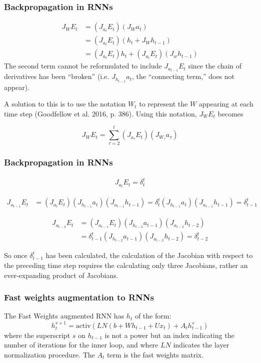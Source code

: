 \documentclass{beamer}
\begin{document}
\begin{frame}
  \frametitle{Backpropagation in RNNs}
  \begin{align*}
  J_{W} E_t & = (J_{a_t} E_t)(J_W a_t) \\
  & = (J_{a_t} E_t)(h_t + J_W h_{t-1}) \\
  & = (J_{a_t} E_t)h_t + (J_{a_t} E_t)(J_w h_{t-1})
\end{align*}
%
  The second term cannot be reformulated to include $J_{a_{t-1}} E_t$ since the chain of derivatives has been ``broken'' (i.e. $J_{h_{t-1}} a_t$, the ``connecting term,'' does not appear).

  \vspace{0.5cm}

  A solution to this is to use the notation $W_t$ to represent the $W$ appearing at each time step (Goodfellow et al. 2016, p. 386). Using this notation, $J_{W} E_t$ becomes

  \begin{equation*}
    J_{W} E_t = \sum_{\tau=2}^{t}  (J_{a_\tau} E_t)(J_{W_\tau} a_\tau)
  \end{equation*}

\end{frame}

\begin{frame}
  \frametitle{Backpropagation in RNNs}
\begin{align*}
  J_{a_t} E_t = \delta_{t}^t
\end{align*}

\begin{align*}
  J_{a_{t-1}} E_t & = (J_{a_t} E_t)(J_{h_{t-1}} a_t)(J_{a_{t-1}} h_{t-1}) = \delta_{t}^t (J_{h_{t-1}} a_{t})(J_{a_{t-1}} h_{t-1})  = \delta_{t-1}^t
\end{align*}

\begin{align*}
  J_{a_{t-2}} E_t & = (J_{a_{t-1}} E_t)(J_{h_{t-2}} a_{t-1})(J_{a_{t-2}} h_{t-2}) \\
  & = \delta_{t-1}^t (J_{h_{t-2}} a_{t-1})(J_{a_{t-2}} h_{t-2}) = \delta_{t-2}^t
\end{align*}

So once $\delta_{t-1}^t$ has been calculated, the calculation of the Jacobian with respect to the preceding time step requires the calculating only three Jacobians, rather an ever-expanding product of Jacobians.

\end{frame}

\begin{frame}
  \frametitle{Fast weights augmentation to RNNs}
  The Fast Weights augmented RNN has $h_t$ of the form:
    \begin{equation*}
      h_t^{s+1} = \mbox{activ}\left(LN(b + Wh_{t-1} + Ux_t) + A_t h_{t-1}^s\right)
    \end{equation*}
    where the superscript $s$ on $h_{t-1}$ is not a power but an index indicating the number of iterations for the inner loop, and where $LN$ indicates the layer normalization procedure. The $A_t$ term is the fast weights matrix.
\end{frame}
\end{document}
